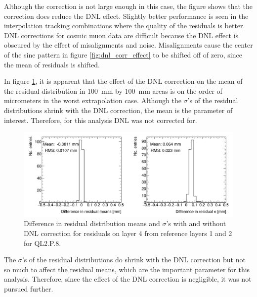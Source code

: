 Although the correction is not large enough in this case, the figure shows that the correction does reduce the DNL effect. Slightly better performance is seen in the interpolation tracking combinations where the quality of the residuals is better. DNL corrections for cosmic muon data are difficult because the DNL effect is obscured by the effect of misalignments and noise. Misalignments cause the center of the sine pattern in figure \ref{fig:dnl_corr_effect} to be shifted off of zero, since the mean of residuals is shifted.

In figure \ref{fig:dnl_compare_fits}, it is apparent that the effect of the DNL correction on the mean of the residual distribution in \SI{100}{\milli\meter} by \SI{100}{\milli\meter} areas is on the order of micrometers in the worst extrapolation case. Although the $\sigma$'s of the residual distributions shrink with the DNL correction, the mean is the parameter of interest. Therefore, for this analysis DNL was not corrected for.

\begin{figure}
    \centering
    \includegraphics[width = \textwidth]{figures/figure_compare_residual_fits_QL2P08_3100V_2021-06-18_no_dnl_minus_QL2P08_3100V_2021-06-18_2_50um_universal_DNL_layer4_fixedlayers12.png}
    \caption{Difference in residual distribution means and $\sigma$'s with and without DNL correction for residuals on layer 4 from reference layers 1 and 2 for QL2.P.8.}
    \label{fig:dnl_compare_fits}
\end{figure}

The $\sigma$'s of the residual distributions do shrink with the DNL correction but not so much to affect the residual means, which are the important parameter for this analysis. Therefore, since the effect of the DNL correction is negligible, it was not pursued further.






























